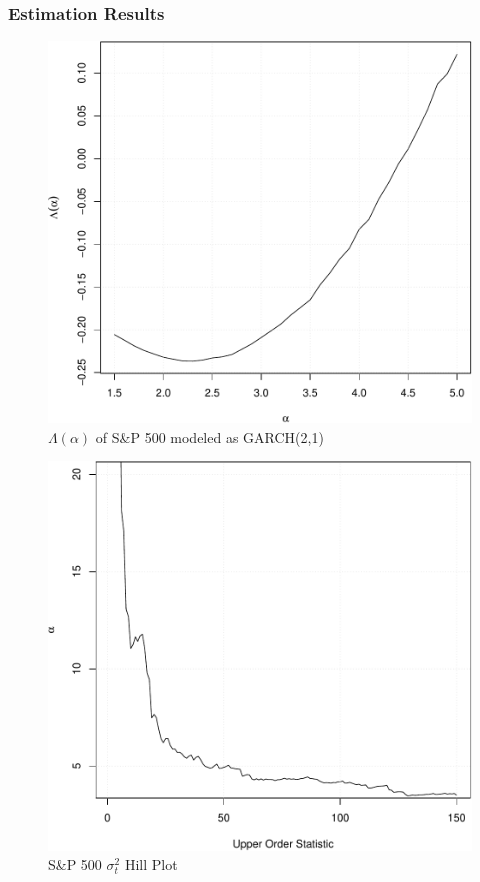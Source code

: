 \documentclass{beamer}
\begin{document}
 \begin{frame}
   \frametitle{Estimation Results}
   \begin{minipage}{0.5\linewidth}
   \begin{figure}[htb!]
     \centering
     \includegraphics[width=\linewidth]{Lambda.pdf}     
     \caption{\scriptsize $\Lambda(\alpha)$ of S\&P 500 modeled as GARCH(2,1)}
     \label{fig:SP500_Lambda}
   \end{figure}
   \end{minipage}\hfill
   \begin{minipage}{0.5\linewidth}
     \begin{figure}[htb!]
       \centering
       \includegraphics[width=\linewidth]{SP500_var_HillPlot.pdf}
       \caption{S\&P 500 $\sigma_t^2$ Hill Plot}
       \label{fig:SP500_var_HillPlot}
     \end{figure}
   \end{minipage}


\end{frame}
\end{document}
